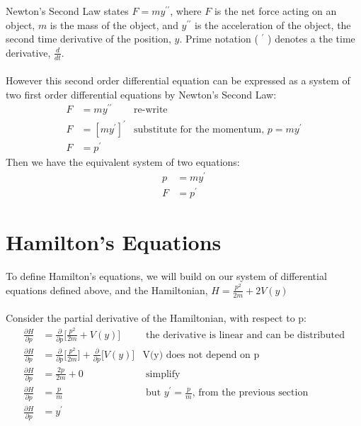\documentclass[12pt]{article}
\begin{document}
	\indent \indent Newton's Second Law states $ F=my^{\prime\prime}$, where $F$ is the net force acting on an object, $m$ is the mass of the object, and $y^{\prime\prime}$ is the acceleration of the object, the second time derivative of the position, $y$. Prime notation ( $^{\prime}$ ) denotes a the time derivative, $\frac{d}{dt}$. 
	\\
	\\
	\indent However this second order differential equation can be expressed as a system of two first order differential equations by Newton's Second Law:
	\begin{align*}
	F&=my^{\prime\prime} &\text{re-write}
	\\
	F&=[my^\prime]^\prime &\text{substitute for the momentum, $p=my^\prime$}
	\\
	F&=p^\prime
	\end{align*}
	\indent Then we have the equivalent system of two equations: 
	\begin{align*}
	p&=my^\prime
	\\
	F&=p^\prime
	\end{align*}
	 
	\clearpage
	
	\section{Hamilton's Equations}

	\indent \indent To define Hamilton's equations, we will build on our system of differential equations defined above, and the Hamiltonian,  $H=\frac{p^2}{2m}+2V(y)$
	\\
	\\
	\indent Consider the partial derivative of the Hamiltonian, with respect to p:
	\begin{align*}
	\frac{\partial H}{\partial p}&=\frac{\partial}{\partial p}\bigg[\frac{p^2}{2m}+V(y)\bigg] &\text{ the derivative is linear and can be distributed}
	\\
	\frac{\partial H}{\partial p}&=\frac{\partial}{\partial p}\bigg[\frac{p^2}{2m}\bigg]+\frac{\partial}{\partial p}\bigg[V(y)\bigg] &\text{V(y) does not depend on p}
	\\
	\frac{\partial H}{\partial p}&=\frac{2p}{2m}+0 &\text{ simplify}
	\\
	\frac{\partial H}{\partial p}&=\frac{p}{m} &\text{  but $y^\prime=\frac{p}{m}$, from the previous section}
	\\
	\frac{\partial H}{\partial p}&=y^\prime
	\end{align*}
	
\end{document}
